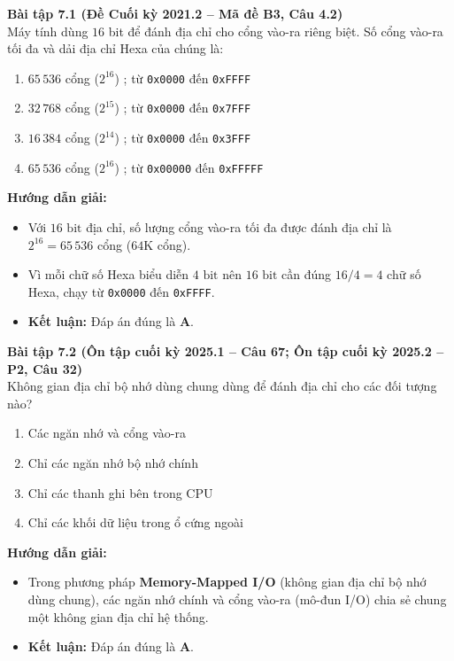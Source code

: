 \textbf{Bài tập 7.1 (Đề Cuối kỳ 2021.2 -- Mã đề B3, Câu 4.2)}\\
Máy tính dùng $16$ bit để đánh địa chỉ cho cổng vào-ra riêng biệt. Số cổng vào-ra tối đa và dải địa chỉ Hexa của chúng là:
\begin{enumerate}[label=\Alph*.]
    \item $65\,536$ cổng ($2^{16}$) ; từ \texttt{0x0000} đến \texttt{0xFFFF}
    \item $32\,768$ cổng ($2^{15}$) ; từ \texttt{0x0000} đến \texttt{0x7FFF}
    \item $16\,384$ cổng ($2^{14}$) ; từ \texttt{0x0000} đến \texttt{0x3FFF}
    \item $65\,536$ cổng ($2^{16}$) ; từ \texttt{0x00000} đến \texttt{0xFFFFF}
\end{enumerate}
\textbf{Hướng dẫn giải:}
\begin{itemize}
    \item Với $16\text{ bit}$ địa chỉ, số lượng cổng vào-ra tối đa được đánh địa chỉ là $2^{16} = 65\,536$ cổng ($64\text{K}$ cổng).
    \item Vì mỗi chữ số Hexa biểu diễn $4\text{ bit}$ nên $16\text{ bit}$ cần đúng $16 / 4 = 4$ chữ số Hexa, chạy từ \texttt{0x0000} đến \texttt{0xFFFF}.
    \item \textbf{Kết luận:} Đáp án đúng là \textbf{A}.
\end{itemize}

\textbf{Bài tập 7.2 (Ôn tập cuối kỳ 2025.1 -- Câu 67; Ôn tập cuối kỳ 2025.2 -- P2, Câu 32)}\\
Không gian địa chỉ bộ nhớ dùng chung dùng để đánh địa chỉ cho các đối tượng nào?
\begin{enumerate}[label=\Alph*.]
    \item Các ngăn nhớ và cổng vào-ra
    \item Chỉ các ngăn nhớ bộ nhớ chính
    \item Chỉ các thanh ghi bên trong CPU
    \item Chỉ các khối dữ liệu trong ổ cứng ngoài
\end{enumerate}
\textbf{Hướng dẫn giải:}
\begin{itemize}
    \item Trong phương pháp \textbf{Memory-Mapped I/O} (không gian địa chỉ bộ nhớ dùng chung), các ngăn nhớ chính và cổng vào-ra (mô-đun I/O) chia sẻ chung một không gian địa chỉ hệ thống.
    \item \textbf{Kết luận:} Đáp án đúng là \textbf{A}.
\end{itemize}

